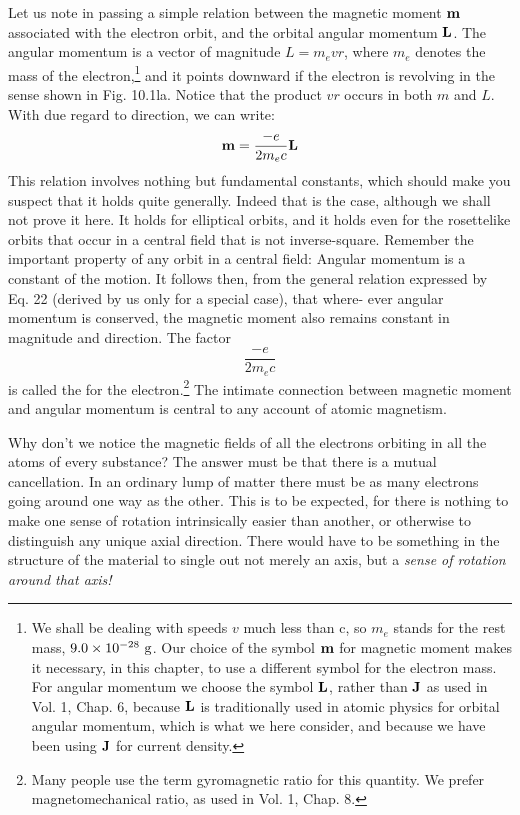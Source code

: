 Let us note in passing a simple relation between the magnetic
moment $\mathbf{m}$ associated with the electron orbit, and the orbital angular
momentum $\mathbf{L}$. The angular momentum is a vector of magnitude
$L = m_evr$, where $m_e$ denotes the mass of the 
electron,\footnote{We shall be dealing with
speeds $v$ much less than c, so $m_e$ stands for the rest mass,
$9.0\times10^{-28}\ \zu{g}$. Our choice of the symbol $\mathbf{m}$ for magnetic moment makes it 
necessary, in this chapter, to use a different symbol for the electron mass. For angular
momentum we choose the symbol $\mathbf{L}$, rather than $\mathbf{J}$ as used in Vol. 1, Chap. 6, because
$\mathbf{L}$ is traditionally used in atomic physics for orbital angular momentum, which is what
we here consider, and because we have been using $\mathbf{J}$ for 
current density.} and it points
downward if the electron is revolving in the sense shown in
Fig. 10.1la. Notice that the product $vr$ occurs in both $m$ and $L$.
With due regard to direction, we can write:
\begin{equation}
  \mathbf{m} = \frac{-e}{2m_ec}\mathbf{L}
\end{equation}
This relation involves nothing but fundamental constants, which
should make you suspect that it holds quite generally. Indeed that
is the case, although we shall not prove it here. It holds for elliptical
orbits, and it holds even for the rosettelike orbits that occur in a
central field that is not inverse-square. Remember the important
property of any orbit in a central field: Angular momentum is a constant
of the motion. It follows then, from the general relation expressed
by Eq. 22 (derived by us only for a special case), that where-
ever angular momentum is conserved, the magnetic moment also
remains constant in magnitude and direction. The factor
\begin{equation}
  \frac{-e}{2m_ec}
\end{equation}
is called the 
for the electron.\footnote{Many people use the term gyromagnetic ratio for this quantity. We prefer 
magnetomechanical ratio, as used in Vol. 1, Chap. 8.} The
intimate connection between magnetic moment and angular momentum
is central to any account of atomic magnetism.

Why don't we notice the magnetic fields of all the electrons orbiting
in all the atoms of every substance? The answer must be that
there is a mutual cancellation. In an ordinary lump of matter there
must be as many electrons going around one way as the other. This
is to be expected, for there is nothing to make one sense of rotation
intrinsically easier than another, or otherwise to distinguish any
unique axial direction. There would have to be something in the
structure of the material to single out not merely an axis, but a \emph{sense
of rotation around that axis!}


